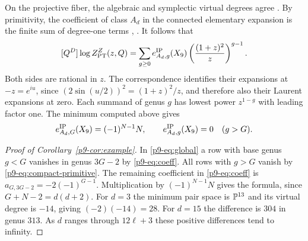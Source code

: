 On the projective fiber, the algebraic and symplectic virtual degrees
agree \cite{siebertgw}. By primitivity, the coefficient of class $A_d$ in
the connected elementary expansion is the finite sum of degree-one terms
\cite[Proposition~3.3 and Theorem~8.1]{ip}, \cite{diw}. It follows that
\[
 [Q^D]\log Z_{\rm PT}^{Z}(z,Q)
     =\sum_{g\ge0} e^{\rm IP}_{A_d,g}(X_9)
           \left(\frac{(1+z)^2}{z}\right)^{g-1}.
\]
Both sides are rational in $z$. The correspondence identifies their expansions
at $-z=e^{iu}$, since $(2\sin(u/2))^2=(1+z)^2/z$, and therefore also
their Laurent expansions at zero. Each summand of genus $g$ has lowest
power $z^{1-g}$ with leading factor one. The minimum computed above gives
\begin{equation}\label{p9-eq:compact-primitive}
 e^{\rm IP}_{A_d,G}(X_9)=(-1)^{N-1}N,\qquad
 e^{\rm IP}_{A_d,g}(X_9)=0\quad(g>G).
\end{equation}

\begin{proof}[Proof of Corollary~\ref{p9-cor:example}]
In \eqref{p9-eq:global} a row with base genus $g<G$ vanishes in
genus $3G-2$ by \eqref{p9-eq:coeff}. All rows with $g>G$ vanish by
\eqref{p9-eq:compact-primitive}. The remaining coefficient in
\eqref{p9-eq:coeff} is $a_{G,3G-2}=-2(-1)^{G-1}$. Multiplication by
$(-1)^{N-1}N$ gives the formula, since $G+N-2=d(d+2)$.
For $d=3$ the minimum pair space is $\mathbb P^{13}$ and its virtual degree
is $-14$, giving $(-2)(-14)=28$. For $d=15$ the difference is $304$
in genus $313$. As $d$ ranges through $12\ell+3$ these positive differences
tend to infinity.
\end{proof}
